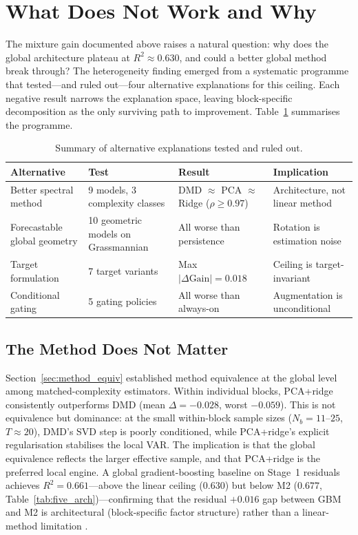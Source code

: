 \documentclass[11pt,a4paper]{article}
\begin{document}
\section{What Does Not Work and Why}
\label{sec:falsification}

The mixture gain documented above raises a natural question: why does the global architecture plateau at $R^2 \approx 0.630$, and could a better global method break through? The heterogeneity finding emerged from a systematic programme that tested---and ruled out---four alternative explanations for this ceiling. Each negative result narrows the explanation space, leaving block-specific decomposition as the only surviving path to improvement. Table~\ref{tab:falsification} summarises the programme.

\begin{table}[H]
\centering
\caption{Summary of alternative explanations tested and ruled out.}
\label{tab:falsification}
\small
\begin{tabular}{p{3.5cm}p{4.5cm}p{3cm}p{3cm}}
\toprule
Alternative & Test & Result & Implication \\
\midrule
Better spectral method & 9 models, 3 complexity classes & DMD $\approx$ PCA $\approx$ Ridge ($\rho \geq 0.97$) & Architecture, not linear method \\
Forecastable global geometry & 10 geometric models on Grassmannian & All worse than persistence & Rotation is estimation noise \\
Target formulation & 7 target variants & Max $|\Delta\text{Gain}| = 0.018$ & Ceiling is target-invariant \\
Conditional gating & 5 gating policies & All worse than always-on & Augmentation is unconditional \\
\bottomrule
\end{tabular}
\end{table}

\subsection{The Method Does Not Matter}

Section~\ref{sec:method_equiv} established method equivalence at the global level among matched-complexity estimators. Within individual blocks, PCA+ridge consistently outperforms DMD (mean $\Delta = -0.028$, worst $-0.059$). This is not equivalence but dominance: at the small within-block sample sizes ($N_b = 11$--$25$, $T \approx 20$), DMD's SVD step is poorly conditioned, while PCA+ridge's explicit regularisation stabilises the local VAR. The implication is that the global equivalence reflects the larger effective sample, and that PCA+ridge is the preferred local engine. A global gradient-boosting baseline on Stage~1 residuals achieves $R^2 = 0.661$---above the linear ceiling ($0.630$) but below M2 ($0.677$, Table~\ref{tab:five_arch})---confirming that the residual $+0.016$ gap between GBM and M2 is architectural (block-specific factor structure) rather than a linear-method limitation \citep[cf.][for machine learning in asset pricing]{gu2020empirical}.
\end{document}
